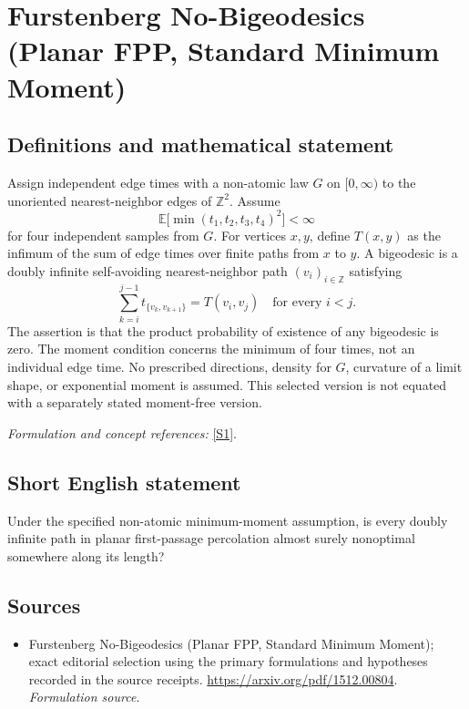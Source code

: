 \documentclass[11pt]{article}
\begin{document}
\section*{\texorpdfstring{Furstenberg No-Bigeodesics (Planar FPP, Standard Minimum Moment)}{Furstenberg No-Bigeodesics (Planar FPP, Standard Minimum Moment)}}\label{statement}
\subsection{Definitions and mathematical statement}
Assign independent edge times with a non-atomic law $G$ on $[0,\infty)$ to the unoriented nearest-neighbor edges of ${\mathbb{Z}}^2$. Assume
\[
 {\mathbb{E}}\bigl[\min(t_1,t_2,t_3,t_4)^2\bigr]<\infty
\]
for four independent samples from $G$. For vertices $x,y$, define $T(x,y)$ as the infimum of the sum of edge times over finite paths from $x$ to $y$. A bigeodesic is a doubly infinite self-avoiding nearest-neighbor path $(v_i)_{i\in{\mathbb{Z}}}$ satisfying
\[
 \sum_{k=i}^{j-1}t_{\{v_k,v_{k+1}\}}=T(v_i,v_j)
 \quad\text{for every }i<j.
\]
The assertion is that the product probability of existence of any bigeodesic is zero. The moment condition concerns the minimum of four times, not an individual edge time. No prescribed directions, density for $G$, curvature of a limit shape, or exponential moment is assumed. This selected version is not equated with a separately stated moment-free version.
\par\smallskip\textit{Formulation and concept references:} \href{https://arxiv.org/pdf/1512.00804}{[S1]}.

\subsection{Short English statement}
Under the specified non-atomic minimum-moment assumption, is every doubly infinite path in planar first-passage percolation almost surely nonoptimal somewhere along its length?
\subsection{Sources}
\begin{itemize}
\item[S1]Furstenberg No-Bigeodesics (Planar FPP, Standard Minimum Moment); exact editorial selection using the primary formulations and hypotheses recorded in the source receipts.
\url{https://arxiv.org/pdf/1512.00804}.
\textit{Formulation source.}
\end{itemize}
\end{document}
